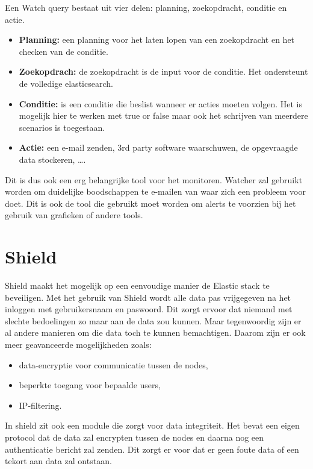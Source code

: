 Een Watch query bestaat uit vier delen: planning, zoekopdracht, conditie en actie. 
\begin{itemize}
	\item \textbf{Planning: } een planning voor het laten lopen van een zoekopdracht en het checken van de conditie.
   
    \item \textbf{Zoekopdrach: } de zoekopdracht is de input voor de conditie. Het ondersteunt de volledige elasticsearch. 

	\item \textbf{Conditie: } is een conditie die beslist wanneer er acties moeten volgen. Het is mogelijk hier te werken met true or false maar ook het schrijven van meerdere scenarios is toegestaan.
    
    \item \textbf{Actie: } een e-mail zenden, 3rd party software waarschuwen, de opgevraagde data stockeren, \dots.
\end{itemize}

Dit is dus ook een erg belangrijke tool voor het monitoren.
Watcher zal gebruikt worden om duidelijke boodschappen te e-mailen van waar zich een probleem voor doet.
Dit is ook de tool die gebruikt moet worden om alerts te voorzien bij het gebruik van grafieken of andere tools.

\section{Shield}
\label{sec:shield}

Shield maakt het mogelijk op een eenvoudige manier de Elastic stack te beveiligen. Met het gebruik van Shield wordt alle data pas vrijgegeven na het inloggen met gebruikersnaam en paswoord. Dit zorgt ervoor dat niemand met slechte bedoelingen zo maar aan de data zou kunnen. 
Maar tegenwoordig zijn er al andere manieren om die data toch te kunnen bemachtigen. Daarom zijn er ook meer geavanceerde mogelijkheden zoals:
\begin{itemize}
	\item data-encryptie voor communicatie tussen de nodes,
    
    \item  beperkte toegang voor bepaalde users,

	\item IP-filtering.
\end{itemize}

In shield zit ook een module die zorgt voor data integriteit. Het bevat een eigen protocol dat de data zal encrypten tussen de nodes en daarna nog een authenticatie bericht zal zenden. Dit zorgt er voor dat er geen foute data of een tekort aan data zal ontstaan.

